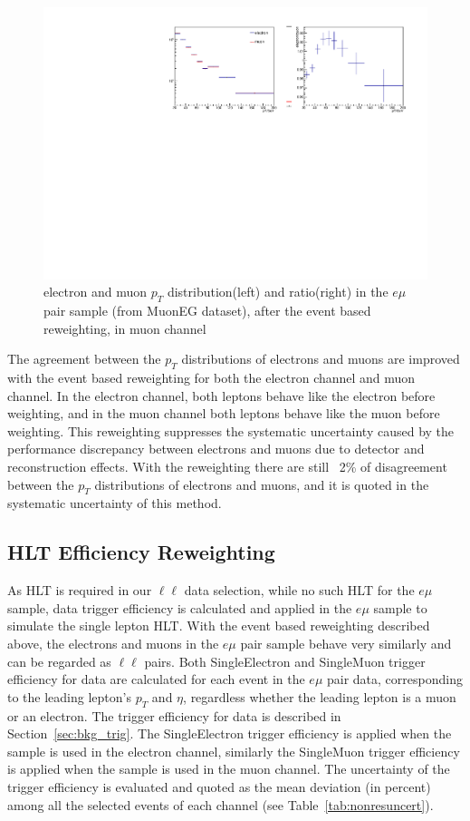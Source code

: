 \begin{figure}[htbp]
\begin{center}
\includegraphics[width=0.72\linewidth]{figures/nonresmuelptmu.pdf}
\caption{electron and muon $p_T$ distribution(left) and ratio(right) in the $e\mu$ pair sample (from MuonEG dataset), after the event based reweighting, in muon channel}
\label{fig:nonresmuelptmu}
\end{center}
\end{figure}

\vspace{0.3cm}
The agreement between the $p_T$ distributions of electrons and muons are improved with the event based reweighting for both the electron channel and muon channel. In the electron channel, both leptons behave like the electron before weighting, and in the muon channel both leptons behave like the muon before weighting. This reweighting suppresses the systematic uncertainty caused by the performance discrepancy between electrons and muons due to detector and reconstruction effects. With the reweighting there are still ~2\% of disagreement between the $p_T$ distributions of electrons and muons, and it is quoted in the systematic uncertainty of this method.

\subsection{HLT Efficiency Reweighting}
As HLT is required in our $\ell \ell$ data selection, while no such HLT for the $e\mu$ sample, data trigger efficiency is calculated and applied in the $e\mu$ sample to simulate the single lepton HLT. With the event based reweighting described above, the electrons and muons in the $e\mu$ pair sample behave very similarly and can be regarded as $\ell \ell$ pairs. Both SingleElectron and SingleMuon trigger efficiency for data are calculated for each event in the $e\mu$ pair data, corresponding to the leading lepton's $p_T$ and $\eta$, regardless whether the leading lepton is a muon or an electron. The trigger efficiency for data is described in Section~\ref{sec:bkg_trig}. The SingleElectron trigger efficiency is applied when the sample is used in the electron channel, similarly the SingleMuon trigger efficiency is applied when the sample is used in the muon channel. The uncertainty of the trigger efficiency is evaluated and quoted as the mean deviation (in percent) among all the selected events of each channel (see Table~\ref{tab:nonresuncert}).

